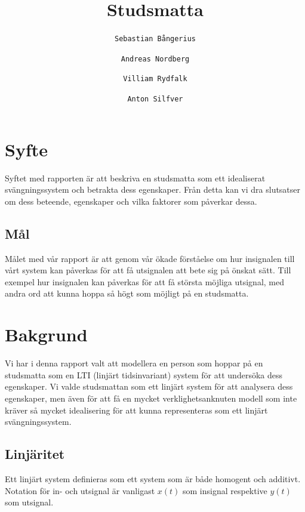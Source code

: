 \documentclass[10pt,a4paper]{article}
\author{
  \texttt{Sebastian Bångerius}
  \and
  \texttt{Andreas Nordberg}
  \and
  \texttt{Villiam Rydfalk}
  \and
  \texttt{Anton Silfver}
}
\begin{document}

\title{Studsmatta}
\maketitle

\cleardoublepage

\tableofcontents

\clearpage

\section{Syfte}
\setcounter{page}{3}

Syftet med rapporten är att beskriva en studsmatta som ett idealiserat svängningssystem och betrakta dess egenskaper. Från detta kan vi dra slutsatser om dess beteende, egenskaper och vilka faktorer som påverkar dessa.

\subsection{Mål}
Målet med vår rapport är att genom vår ökade förståelse om hur insignalen till vårt system kan påverkas för att få utsignalen att bete sig på önskat sätt. Till exempel hur insignalen kan påverkas för att få största möjliga utsignal, med andra ord att kunna hoppa så högt som möjligt på en studsmatta.



\section{Bakgrund}

Vi har i denna rapport valt att modellera en person som hoppar på en studsmatta som en LTI (linjärt tidsinvariant) system för att undersöka dess egenskaper. Vi valde studsmattan som ett linjärt system för att analysera dess egenskaper, men även för att få en mycket verklighetsanknuten modell som inte kräver så mycket idealisering för att kunna representeras som ett linjärt svängningssystem.

\subsection{Linjäritet}

Ett linjärt system definieras som ett system som är både homogent och additivt. Notation för in- och utsignal är vanligast $x(t)$ som insignal respektive $y(t)$ som utsignal.
\end{document}
